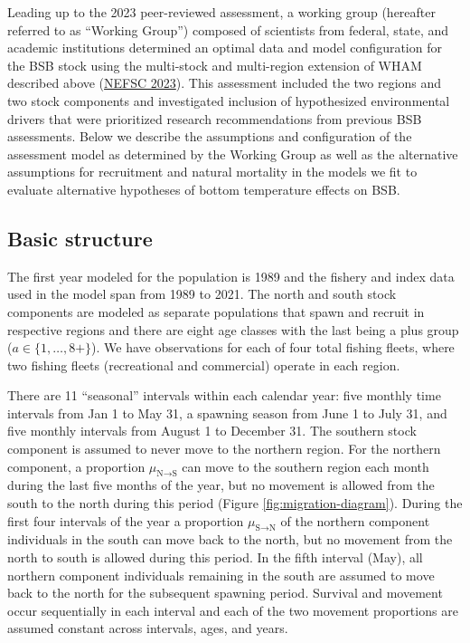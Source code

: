 \documentclass[
]{article}
\begin{document}
Leading up to the 2023 peer-reviewed assessment, a working group (hereafter referred to as ``Working Group'') composed of scientists from federal, state, and academic institutions determined an optimal data and model configuration for the BSB stock using the multi-stock and multi-region extension of WHAM described above (\protect\hyperlink{ref-nefsc23}{NEFSC 2023}). This assessment included the two regions and two stock components and investigated inclusion of hypothesized environmental drivers that were prioritized research recommendations from previous BSB assessments. Below we describe the assumptions and configuration of the assessment model as determined by the Working Group as well as the alternative assumptions for recruitment and natural mortality in the models we fit to evaluate alternative hypotheses of bottom temperature effects on BSB.

\hypertarget{basic-structure}{%
\subsection*{Basic structure}\label{basic-structure}}

The first year modeled for the population is 1989 and the fishery and index data used in the model span from 1989 to 2021. The north and south stock components are modeled as separate populations that spawn and recruit in respective regions and there are eight age classes with the last being a plus group (\(a \in \{1,\ldots,8+\}\)). We have observations for each of four total fishing fleets, where two fishing fleets (recreational and commercial) operate in each region.

There are 11 ``seasonal'' intervals within each calendar year: five monthly time intervals from Jan 1 to May 31, a spawning season from June 1 to July 31, and five monthly intervals from August 1 to December 31. The southern stock component is assumed to never move to the northern region. For the northern component, a proportion \(\mu_{\text{N}\rightarrow \text{S}}\) can move to the southern region each month during the last five months of the year, but no movement is allowed from the south to the north during this period (Figure \ref{fig:migration-diagram}). During the first four intervals of the year a proportion \(\mu_{\text{S}\rightarrow \text{N}}\) of the northern component individuals in the south can move back to the north, but no movement from the north to south is allowed during this period. In the fifth interval (May), all northern component individuals remaining in the south are assumed to move back to the north for the subsequent spawning period. Survival and movement occur sequentially in each interval and each of the two movement proportions are assumed constant across intervals, ages, and years.
\end{document}

